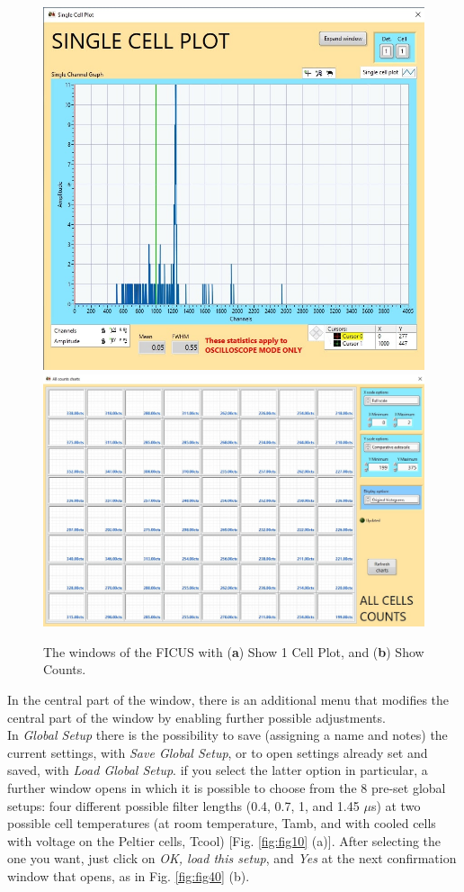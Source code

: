 \documentclass[a4paper,12pt,oneside,pdflatex,italian,final,twocolumn]{article}
\begin{document}
\begin{figure}[h]
\centering
\subfloat
{\includegraphics[width=.35\textwidth]{Capture54.jpg}} \quad
\subfloat
{\includegraphics[width=.55\textwidth]{Capture55.jpg}} \\
\caption{The windows of the FICUS with (\textbf{a}) Show 1 Cell Plot, and (\textbf{b}) Show Counts.}\label{fig:fig39}
\end{figure}

In the central part of the window, there is an additional menu that modifies the central part of the window by enabling further possible adjustments. \\
In \textit{Global Setup} there is the possibility to save (assigning a name and notes) the current settings, with \textit{Save Global Setup}, or to open settings already set and saved, with \textit{Load Global Setup}. if you select the latter option in particular, a further window opens in which it is possible to choose from the 8 pre-set global setups: four different possible filter lengths (0.4, 0.7, 1, and 1.45 $\mu$s) at two possible cell temperatures (at room temperature, Tamb, and with cooled cells with voltage on the Peltier cells, Tcool) [Fig. \ref{fig:fig10} (a)]. After selecting the one you want, just click on \textit{OK, load this setup}, and \textit{Yes} at the next confirmation window that opens, as in Fig. \ref{fig:fig40} (b).
\end{document}

